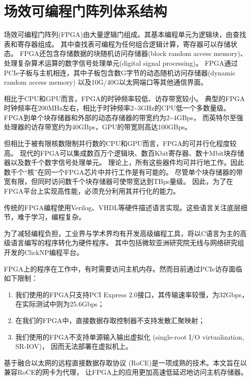 \section{场效可编程门阵列体系结构}
场效可编程门阵列(FPGA)由大量逻辑门组成。其基本编程单元为逻辑块，由查找表和寄存器组成。
其中查找表可编程为任何组合逻辑计算，寄存器可以存储状态。
FPGA还包含存储数据的块随机访问存储器(block random access memory)、
处理复杂算术运算的数字信号处理单元(digital signal processing)。
FPGA通过PCIe子板与主机相连，其中子板包含数G字节的动态随机访问存储器(dynamic random access memory)
以及10G/40G以太网端口等其他通信界面。

相比于CPU和GPU而言，FPGA的时钟频率较低、访存带宽较小。
典型的FPGA时钟频率在200MHz左右，相比于时钟频率2\textasciitilde 3GHz的CPU低一个多数量级。
FPGA到单个块存储器和外部的动态存储器的带宽约为2\textasciitilde 4GBps，
而英特尔至强处理器的访存带宽约为40GBps，GPU的带宽则高达100GBps。

但相比于被有限核数限制并行数的CPU和GPU而言，FPGA的可并行化程度较高。
现代的FPGA可以集成数百万个逻辑块、数百Kbit寄存器、数十Mbit块存储器以及数千个数字信号处理单元。
理论上，所有这些器件均可并行地工作。因此数千个“核”在同一个FPGA芯片中并行工作是有可能的。
尽管单个块存储器的带宽有限，但同时访问数千个块存储器可使带宽达到TBps量级。
因此，为了在FPGA平台上实现高性能，必须充分利用其并行化的能力。

传统的FPGA编程使用Verilog、VHDL等硬件描述语言实现。这些语言关注底层细节，难于学习，编程复杂。

为了减轻编程负担，工业界与学术界均有开发高级编程工具，将以C语言为主的高级语言编写的程序转化为硬件程序。
其中包括微软亚洲研究院无线与网络研究组开发的ClickNP编程平台\cite{clicknp}。

FPGA上的程序在工作中，有时需要访问主机内存。然而目前通过PCIe访存面临如下限制：
\begin{enumerate}
\item 我们使用的FPGA只支持PCI Express 2.0\cite{pcie}接口，其传输速率较慢，为32Gbps，在实际测试中则为25.6Gbps；
\item 在我们的FPGA中，直接数据存取控制器不支持发散汇聚映射\cite{chapter3}；
\item 我们使用的FPGA不支持单源输入输出虚拟化 (single-root I/O virtualization, SR-IOV)\cite{irsov}，
因而无法部署在虚拟机上。
\end{enumerate}

基于融合以太网的远程直接数据存取协议 (RoCE)是一项成熟的技术。本文旨在以兼容RoCE的网卡为代理，
让FPGA上的应用更加高速低延迟地访问主机存储器。


